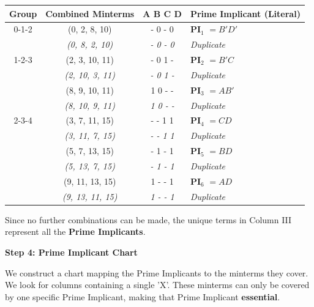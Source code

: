 \documentclass[12pt,a3paper]{article}
\begin{document}
\begin{enumerate}
\begin{tcolorbox}[enhanced,breakable,ansbox,colback=cC!4,colframe=cC,boxrule=0.8pt,arc=5pt,title={\textbf{Answer}},fonttitle=\bfseries\color{white},colbacktitle=cC]
\begin{center}
\begin{tabular}{cccl}
\toprule
\textbf{Group} & \textbf{Combined Minterms} & \textbf{A B C D} & \textbf{Prime Implicant (Literal)} \\
\midrule
0-1-2 & (0, 2, 8, 10) & - 0 - 0 & \textbf{PI$_1$} $= B'D'$ \\
      & \textit{(0, 8, 2, 10)} & \textit{- 0 - 0} & \textit{Duplicate} \\
\midrule
1-2-3 & (2, 3, 10, 11) & - 0 1 - & \textbf{PI$_2$} $= B'C$ \\
      & \textit{(2, 10, 3, 11)} & \textit{- 0 1 -} & \textit{Duplicate} \\
      & (8, 9, 10, 11) & 1 0 - - & \textbf{PI$_3$} $= AB'$ \\
      & \textit{(8, 10, 9, 11)} & \textit{1 0 - -} & \textit{Duplicate} \\
\midrule
2-3-4 & (3, 7, 11, 15) & - - 1 1 & \textbf{PI$_4$} $= CD$ \\
      & \textit{(3, 11, 7, 15)} & \textit{- - 1 1} & \textit{Duplicate} \\
      & (5, 7, 13, 15) & - 1 - 1 & \textbf{PI$_5$} $= BD$ \\
      & \textit{(5, 13, 7, 15)} & \textit{- 1 - 1} & \textit{Duplicate} \\
      & (9, 11, 13, 15) & 1 - - 1 & \textbf{PI$_6$} $= AD$ \\
      & \textit{(9, 13, 11, 15)} & \textit{1 - - 1} & \textit{Duplicate} \\
\bottomrule
\end{tabular}
\end{center}
Since no further combinations can be made, the unique terms in Column III represent all the \textbf{Prime Implicants}.

\vspace{1em}
\textbf{\large Step 4: Prime Implicant Chart}

We construct a chart mapping the Prime Implicants to the minterms they cover. We look for columns containing a single 'X'. These minterms can only be covered by one specific Prime Implicant, making that Prime Implicant \textbf{essential}.


\end{tcolorbox}
\end{enumerate}
\end{document}

